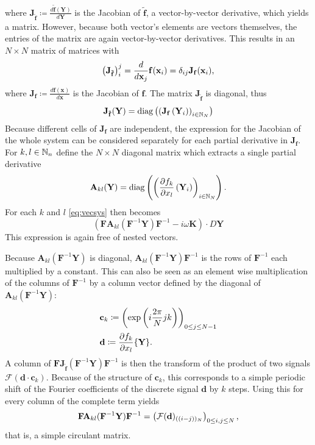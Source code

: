 
where $\mathbf J_{\mathbf{\tilde f}} \coloneqq \frac{d \mathbf{\tilde f}(\mathbf Y)}{d\mathbf Y}$ is the Jacobian of $\mathbf{\tilde f}$, a vector-by-vector derivative, which yields a matrix.
However, because both vector's elements are vectors themselves, the entries of the matrix are again vector-by-vector derivatives.
This results in an $N \times N$ matrix of matrices with
	\[
			\left(\mathbf J_{\mathbf{\tilde f}}\right)_i^j = \frac{d}{d\mathbf x_j} \mathbf f (\mathbf x_i) = \delta_{ij} \mathbf J_\mathbf f(\mathbf x_i) \text, %
	\]
where $\mathbf J _ \mathbf f \coloneqq \frac{d \mathbf f(\mathbf x)}{d\mathbf x}$ is the Jacobian of $\mathbf f$.
The matrix $\mathbf J_{\mathbf{\tilde f}}$ is diagonal, thus
	\[
		\mathbf J _ \mathbf{\tilde f} (\mathbf Y) = \operatorname{diag}\left( \left(\mathbf J _ \mathbf f \left(\mathbf Y_i\right) \right)_{i \in \mathbb{N}_N} \right)
	\]
Because different cells of $\mathbf J_{\mathbf f}$ are independent, the expression for the Jacobian of the whole system can be considered separately for each partial derivative in $\mathbf J _\mathbf f$.
For $k,l \in \mathbb{N}_n$ define the $N \times N$ diagonal matrix which extracts a single partial derivative
	\[
		\mathbf A_{kl}(\mathbf Y) = \operatorname{diag}\left( \left(\frac{\partial f_k}{\partial x_l} \left(\mathbf Y_i\right)\right)_{i \in \mathbb{N}_N} \right) \text.
	\]
For each $k$ and $l$ \autoref{eq:vecsys} then becomes
	\begin{equation}
		\left( \mathbf{F} \mathbf A_{kl}(\mathbf{F}^{-1} \mathbf{Y}) \mathbf{F}^{-1} - i \omega \mathbf K \right) \cdot D \mathbf Y
	\label{eq:syssingle}
	\end{equation}
This expression is again free of nested vectors.

Because $\mathbf A_{kl}(\mathbf{F}^{-1} \mathbf{Y})$ is diagonal, $\mathbf A_{kl}(\mathbf{F}^{-1} \mathbf{Y}) \mathbf{F}^{-1}$ is the rows of $\mathbf F^{-1}$ each multiplied by a constant.
This can also be seen as an element wise multiplication of the columns of $\mathbf F^{-1}$ by a column vector defined by the diagonal of $\mathbf A_{kl}(\mathbf{F}^{-1} \mathbf{Y})$:
	\begin{align*}
		&\mathbf c_k \coloneqq \left(\exp\left(i\frac{2\pi}{N} j k\right)\right)_{0 \le j \le N-1}\\
		&\mathbf d \coloneqq \frac{\partial f_k}{\partial x_l} \{\mathbf Y\} \text.
	\end{align*}	
A column of $\mathbf{F} \mathbf J_{\mathbf{\tilde f}} \left( \mathbf{F}^{-1} \mathbf{Y} \right) \mathbf{F}^{-1}$ is then the transform of the product of two signals $\mathcal F(\mathbf d \cdot \mathbf c_k)$.
Because of the structure of $\mathbf c_k$, this corresponds to a simple periodic shift of the Fourier coefficients of the discrete signal $\mathbf d$ by $k$ steps.
Using this for every column of the complete term yields
	\[
			\mathbf{F} \mathbf A_{kl}(\mathbf{F}^{-1} \mathbf{Y}) \mathbf{F}^{-1} = \left( \mathbf {\mathcal{F}}(\mathbf d)_{((i-j))_N} \right)_{0 \le i,j \le N} \text,
	\]
that is, a simple circulant matrix.

